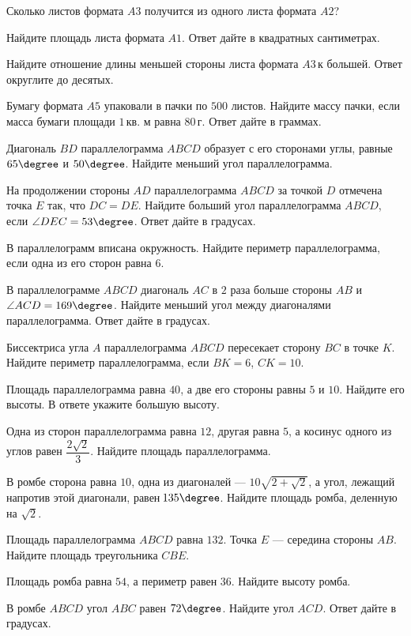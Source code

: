 \begin{class}[number=1]
\begin{listofex}
		\item Сколько листов формата \( A3 \) получится из одного листа формата \( A2 \)?
		\item Найдите площадь листа формата \( A1 \). Ответ дайте в квадратных сантиметрах.
		\item Найдите отношение длины меньшей стороны листа формата \( A3 \) к большей. Ответ округлите до десятых.
		\item Бумагу формата \( A5 \) упаковали в пачки по \( 500 \) листов. Найдите массу пачки, если масса бумаги площади \( 1 \) кв. м равна \( 80 \) г. Ответ дайте в граммах.
		\item Диагональ \( BD \) параллелограмма \( ABCD \) образует с его сторонами углы, равные \( 65\degree \) и \( 50\degree \). Найдите меньший угол параллелограмма.
		\item На продолжении стороны \( AD \) параллелограмма \( ABCD \) за точкой \( D \) отмечена точка \( E \) так, что \( DC=DE \). Найдите больший угол параллелограмма \( ABCD \), если \( \angle DEC=53\degree \). Ответ дайте в градусах.
		\item В параллелограмм вписана окружность. Найдите периметр параллелограмма, если одна из его сторон равна \( 6 \).
		\item В параллелограмме \( ABCD \) диагональ \( AC \) в \( 2 \) раза больше стороны \( AB \) и \( \angle ACD=169\degree\). Найдите меньший угол между диагоналями параллелограмма. Ответ дайте в градусах.
		\item Биссектриса угла \( A \) параллелограмма \( ABCD \) пересекает сторону \( BC \) в точке \( K \). Найдите периметр параллелограмма, если \( BK=6 \), \( CK=10 \).
		\item Площадь параллелограмма равна \( 40 \), а две его стороны равны \( 5 \) и \( 10 \). Найдите его высоты. В ответе укажите большую высоту.
		\item Одна из сторон параллелограмма равна \( 12 \), другая равна \( 5 \), а косинус одного из углов равен \( \dfrac{2\sqrt{2}}{3} \). Найдите площадь параллелограмма.
		\item В ромбе сторона равна \( 10 \), одна из диагоналей --- \( 10\sqrt{2+\sqrt{2}} \), а угол, лежащий напротив этой диагонали, равен \( 135\degree \). Найдите площадь ромба, деленную на \( \sqrt{2} \).
		\item Площадь параллелограмма \( ABCD \) равна \( 132 \). Точка \( E \) --- середина стороны \( AB \). Найдите площадь треугольника \( CBE \).
		\item Площадь ромба равна \( 54 \), а периметр равен \( 36 \). Найдите высоту ромба.
		\item В ромбе \( ABCD \) угол \( ABC \) равен \( 72\degree \). Найдите угол \( ACD \). Ответ дайте в градусах.
	\end{listofex}
\end{class}

